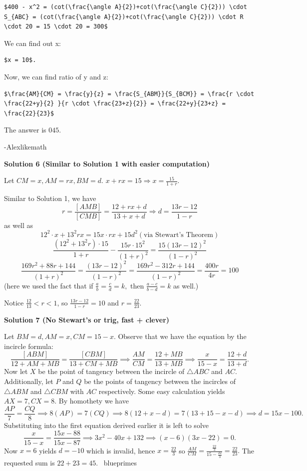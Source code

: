 \begin{enumerate}
 \begin{verbatim}
$400 - x^2 = (cot(\frac{\angle A}{2})+cot(\frac{\angle C}{2})) \cdot S_{ABC} = (cot(\frac{\angle A}{2})+cot(\frac{\angle C}{2})) \cdot R \cdot 20 = 15 \cdot 20 = 300$
\end{verbatim}

We can find out x:

 \begin{verbatim}
$x = 10$.
\end{verbatim}

Now, we can find ratio of y and z:

 \begin{verbatim}
$\frac{AM}{CM} = \frac{y}{z} = \frac{S_{ABM}}{S_{BCM}} = \frac{r \cdot \frac{22+y}{2} }{r \cdot \frac{23+z}{2}} = \frac{22+y}{23+z} = \frac{22}{23}$ 
\end{verbatim}

The answer is $\boxed{045}$. 

 -Alexlikemath

 



\textbf{Solution 6 (Similar to Solution 1 with easier computation)}

Let $CM=x, AM=rx, BM=d$. $x+rx=15\Rightarrow x=\frac{15}{1+r}$.

 Similar to Solution 1, we have 
 \[r=\frac{[AMB]}{[CMB]}=\frac{12+rx+d}{13+x+d} \Rightarrow d=\frac{13r-12}{1-r}\]as well as
 \[12^2\cdot x + 13^2 rx=15x\cdot rx+15d^2 (\text{via Stewart's Theorem})\]
 \[\frac{(12^2 + 13^2r) \cdot 15}{1+r} - \frac{15r\cdot 15^2}{(1+r)^2}=\frac{15(13r-12)^2}{(1-r)^2}\]
 \[\frac{169r^2+88r+144}{(1+r)^2}=\frac{(13r-12)^2}{(1-r)^2} =\frac{169r^2-312r+144}{(1-r)^2} =\frac{400r}{4r}=100\](here we used the fact that if $\frac{a}{b} = \frac{c}{d} = k,$ then $\frac{a-c}{b-d}=k$ as well.)

 Notice $\frac{12}{13} < r < 1$, so $\frac{13r-12}{1-r} = 10$ and $\boxed{r = \frac{22}{23}}.$




\textbf{Solution 7 (No Stewart's or trig, fast + clever)}

Let $BM = d, AM = x, CM = 15 - x$. Observe that we have the equation by the incircle formula:
 \[\frac{[ABM]}{12 + AM + MB} = \frac{[CBM]}{13 + CM + MB} \implies \frac{AM}{CM} = \frac{12 + MB}{13 + MB} \implies \frac{x}{15 - x} = \frac{12 + d}{13 + d}.\]Now let $X$ be the point of tangency between the incircle of $\triangle ABC$ and $AC$. Additionally, let $P$ and $Q$ be the points of tangency between the incircles of $\triangle ABM$ and $\triangle CBM$ with $AC$ respectively. Some easy calculation yields $AX = 7, CX = 8$. By homothety we have
 \[\frac{AP}{7} = \frac{CQ}{8} \implies 8(AP) = 7(CQ) \implies 8(12 + x - d) = 7(13 + 15 - x - d) \implies d = 15x - 100.\]Substituting into the first equation derived earlier it is left to solve
 \[\frac{x}{15 - x} = \frac{15x - 88}{15x - 87} \implies 3x^2 - 40x + 132 \implies (x - 6)(3x - 22) = 0.\]Now $x = 6$ yields $d = -10$ which is invalid, hence $x = \frac{22}{3}$ so $\frac{AM}{CM} = \frac{\frac{22}{3}}{15 - \frac{22}{3}} = \frac{22}{23}.$ The requested sum is $22 + 23 = \boxed{45}$. ~blueprimes


\end{enumerate}

